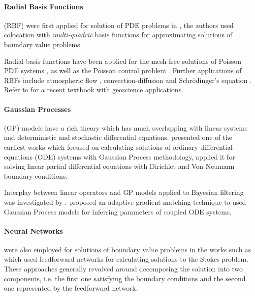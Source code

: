 \paragraph{Radial Basis Functions} (RBF) were first applied for solution of PDE problems in 
\citet{KANSA1990147}, the authors used colocation with \emph{multi-quadric} basis functions for 
approximating solutions of boundary value problems.

Radial basis functions have been applied for the mesh-free solutions of Poisson PDE systems 
\citep{AMINATAEI20082887,DUAN200866,DUAN2006394,CNM:CNM419}, as well as the Poisson control problem 
\citep{Pearson2013}. Further applications of RBFs include atmospheric flow 
\citep{Tillenius2015406}, convection-diffusion \citep{Safdari-Vaighani2015} and Schr\"{o}dinger's 
equation \citep{doi:10.1137/120893975}. Refer to \citet{fornberg2015} for a recent textbook with 
geoscience applications.

\paragraph{Gaussian Processes} (GP) models \citep{Rasmussen:2005:GPM:1162254} have a rich theory 
which has much overlapping with linear systems and deterministic and stochastic differential 
equations. \citet{Skilling1992} presented one of the earliest works which focused on calculating 
solutions of ordinary differential equations (ODE) systems with Gaussian Process methodology, 
\citet{Graepel} applied it for solving linear partial differential equations with Dirichlet and 
Von Neumann boundary conditions.

Interplay between linear operators and GP models applied to Bayesian filtering was investigated by 
\citet{Sarkka2011}. \citet{pmlr-v31-dondelinger13a} proposed an adaptive gradient matching 
technique to used Gaussian Process models for inferring parameters of coupled ODE systems.

\paragraph{Neural Networks} were also employed for solutions of boundary value problems in the 
works such as \citet{Lagaris,Aarts2001,TSOULOS20092385,Baymani2011} which used feedforward networks 
for calculating solutions to the Stokes problem. These approaches generally revolved around 
decomposing the solution into two components, i.e. the first one satisfying the boundary conditions 
and the second one represented by the feedforward network.

